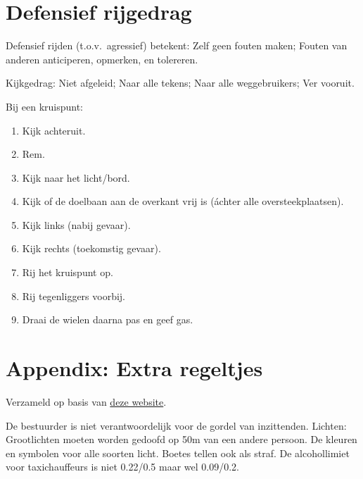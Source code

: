 \section{Defensief rijgedrag}
\begin{outline}
\1 Defensief rijden (t.o.v.\ agressief) betekent:
	\2 Zelf geen fouten maken;
	\2 Fouten van anderen anticiperen, opmerken, en tolereren.

\1 Kijkgedrag:
	\2 Niet afgeleid;
	\2 Naar alle tekens;
	\2 Naar alle weggebruikers;
	\2 Ver vooruit.

\1 Bij een kruispunt:
\begin{enumerate}
	\item Kijk achteruit.
	\item Rem.
	\item Kijk naar het licht/bord.
	\item Kijk of de doelbaan aan de overkant vrij is (áchter alle oversteekplaatsen).
	\item Kijk links (nabij gevaar).
	\item Kijk rechts (toekomstig gevaar).
	\item Rij het kruispunt op.
	\item Rij tegenliggers voorbij.
	\item Draai de wielen daarna pas en geef gas.
\end{enumerate}
\end{outline}

\section{Appendix: Extra regeltjes}
Verzameld op basis van \href{https://mijnrijbewijs.eu/}{deze website}.
\begin{outline}
\1 De bestuurder is niet verantwoordelijk voor de gordel van inzittenden.
\1 Lichten:
	\2 Grootlichten moeten worden gedoofd op 50m van een andere persoon.
	\2 De kleuren en symbolen voor alle soorten licht.
\1 Boetes tellen ook als straf.
\1 De alcohollimiet voor taxichauffeurs is niet 0.22/0.5 maar wel 0.09/0.2.
\end{outline}